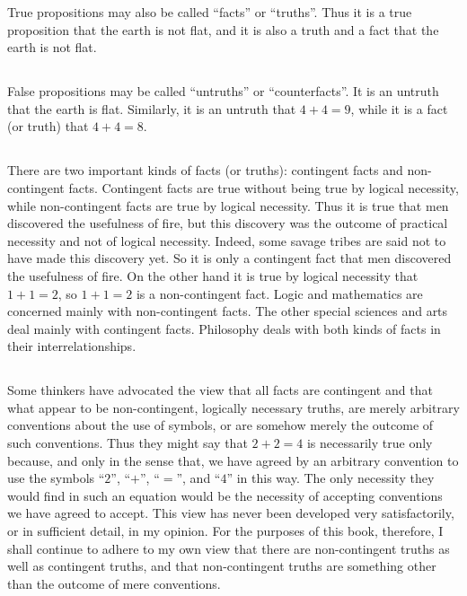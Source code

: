 \documentclass{book}
\let\oldmarginpar\marginpar
\renewcommand*{\marginpar}[1]{\oldmarginpar{\footnotesize#1}}
\begin{document}
True propositions may also be called “facts” or “truths”.  Thus it is a true proposition that the earth is not flat, and it is also a truth and a fact that the earth is not flat.

\subsection{}
\label{sec:2.8}

False propositions may be called “untruths” or “counterfacts”.  It is an untruth that the earth is flat.  Similarly, it is an untruth that \(4 + 4 = 9\), while it is a fact (or truth) that \(4 + 4 = 8\).

\subsection{}
\label{sec:2.9}

There are two important kinds of facts (or truths): contingent facts and non-contingent facts.  Contingent facts are true without being true by logical necessity, while non-contingent facts are true by logical necessity.  Thus it is true that men discovered the usefulness of fire, but this discovery was the outcome of practical necessity and not of logical necessity.  Indeed, some savage tribes are said not to have made this discovery yet.  So it is only a contingent fact that men discovered the usefulness of fire.  On the other hand it is true by logical necessity that \(1 + 1 = 2\), so \(1 + 1 = 2\) is a non-contingent fact.  Logic and mathematics are concerned mainly with non-contingent facts.  The other special sciences and arts deal mainly with contingent facts.  Philosophy deals with both kinds of facts in their interrelationships.

\subsection{}
\label{sec:2.10}

Some thinkers have advocated the view that all facts are contingent and that what appear to be non-contingent, logically necessary truths, are merely arbitrary conventions about the use of symbols, or are somehow merely the outcome of such conventions.  Thus they might say that \(2 + 2 = 4\) is necessarily true only because, and only in the sense that, we have agreed by an arbitrary convention to use the symbols “\(2\)”, “\(+\)”, “\(=\)”, and “\(4\)” in this way.  The only necessity they would find in such an equation would be the necessity of accepting conventions we have agreed to accept.  This view has never been developed very satisfactorily, or in sufficient detail, in my opinion.  For the purposes of this book, therefore, I shall continue to adhere to my own view that there are non-contingent truths \marginpar{8}as well as contingent truths, and that non-contingent truths are something other than the outcome of mere conventions.
\end{document}
